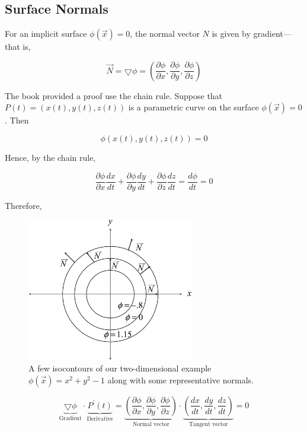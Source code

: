 \subsection{Surface Normals}
For an implicit surface $\phi(\vec{x})=0$, the normal vector $N$ is given by gradient---that is,

\begin{equation}\label{e:implicit-surface-gradient}
	\vec{N}=\bigtriangledown\phi=(\frac{\partial\phi}{\partial{x}},\frac{\partial\phi}{\partial{y}},\frac{\partial\phi}{\partial{z}})
\end{equation}

The book \cite{b:AnIntegratedIntroductiontoCG} provided a proof use the chain rule. Suppose that $P(t)=(x(t),y(t),z(t))$ is a parametric curve on the surface $\phi(\vec{x})=0$. Then

\begin{equation*}
	\phi (x(t),y(t),z(t))=0
\end{equation*}

Hence, by the chain rule,

\begin{equation*}
		\frac{\partial\phi}{\partial{x}}\frac{dx}{dt}+\frac{\partial\phi}{\partial{y}}\frac{dy}{dt}+\frac{\partial\phi}{\partial{z}}\frac{dz}{dt}=\frac{d\phi}{dt}=0
\end{equation*} 

Therefore,

\begin{figure}
\sidecaption
\includegraphics[width=0.65\textwidth]{graphics/df/gradient-of-implicit-function}
\caption{A few isocontours of our two-dimensional example $\phi(\vec{x})=x^2 + y^2-1$
along with some representative normals.}	
\end{figure}

\begin{equation*}
	\underbrace{\bigtriangledown\phi}_{\text{Gradient}}\cdot\underbrace{P^{'}(t)}_{\text{Derivative}}=\underbrace{(\frac{\partial\phi}{\partial{x}},\frac{\partial\phi}{\partial{y}},\frac{\partial\phi}{\partial{z}})}_{\text{Normal vector}}\cdot\underbrace{(\frac{dx}{dt},\frac{dy}{dt},\frac{dz}{dt})}_{\text{Tangent vector}}=0
\end{equation*}

